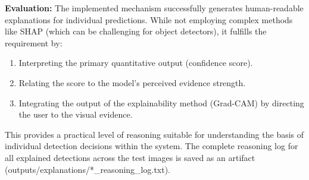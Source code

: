 \textbf{Evaluation:}
The implemented mechanism successfully generates human-readable explanations for individual predictions. While not employing complex methods like SHAP (which can be challenging for object detectors), it fulfills the requirement by:
\begin{enumerate}
    \item  Interpreting the primary quantitative output (confidence score).
    \item  Relating the score to the model's perceived evidence strength.
    \item  Integrating the output of the explainability method (Grad-CAM) by directing the user to the visual evidence.
\end{enumerate}
This provides a practical level of reasoning suitable for understanding the basis of individual detection decisions within the system. The complete reasoning log for all explained detections across the test images is saved as an artifact ({outputs/explanations/*\_reasoning\_log.txt}).


